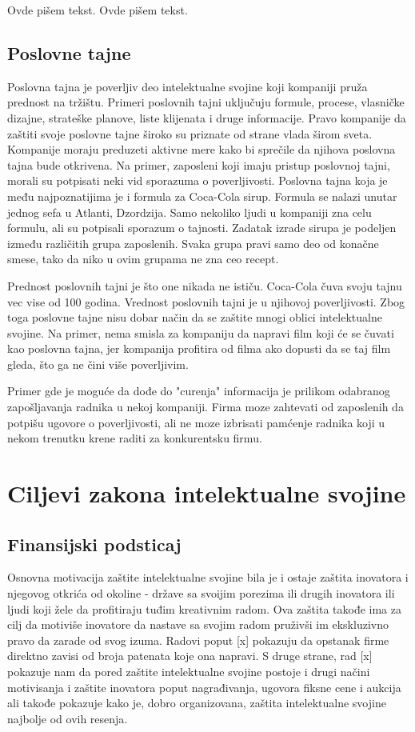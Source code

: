 \documentclass[a4paper]{article}
\begin{document}
Ovde pišem tekst. 
Ovde pišem tekst. 

\subsection{Poslovne tajne}
\label{subsec:poslovne}

Poslovna tajna je poverljiv deo intelektualne svojine koji kompaniji pruža prednost na tržištu. Primeri poslovnih tajni uključuju formule, procese, vlasničke dizajne, strateške planove, liste klijenata i druge informacije. Pravo kompanije da zaštiti svoje poslovne tajne široko su priznate od strane vlada širom sveta. Kompanije moraju preduzeti aktivne mere kako bi sprečile da njihova poslovna tajna bude otkrivena. Na primer, zaposleni koji imaju pristup poslovnoj tajni, morali su potpisati neki vid sporazuma o poverljivosti. Poslovna tajna koja je među najpoznatijima je i formula za Coca-Cola sirup. Formula se nalazi unutar jednog sefa u Atlanti, Dzordzija. Samo nekoliko ljudi u kompaniji zna celu formulu, ali su potpisali sporazum o tajnosti. Zadatak izrade sirupa je podeljen između različitih grupa zaposlenih. Svaka grupa pravi samo deo od konačne smese, tako da niko u ovim grupama ne zna ceo recept.

Prednost poslovnih tajni je što one nikada ne ističu. Coca-Cola čuva svoju tajnu vec vise od 100 godina.
Vrednost poslovnih tajni je u njihovoj poverljivosti. Zbog toga poslovne tajne nisu dobar način da se zaštite mnogi oblici intelektualne svojine. Na primer, nema smisla za kompaniju da napravi film koji će se čuvati kao poslovna tajna, jer kompanija profitira od filma ako dopusti da se taj film gleda, što ga ne čini više poverljivim.

Primer gde je moguće da dođe do "curenja" informacija je prilikom odabranog zapošljavanja radnika u nekoj kompaniji. Firma moze zahtevati od zaposlenih da potpišu ugovore o poverljivosti, ali ne moze izbrisati pamćenje radnika koji u nekom trenutku krene raditi za konkurentsku firmu.

\section{Ciljevi zakona intelektualne svojine}

\subsection{Finansijski podsticaj}

Osnovna motivacija zaštite intelektualne svojine bila je i ostaje zaštita inovatora i njegovog otkrića od okoline - države sa svoijim porezima ili drugih
inovatora ili ljudi koji žele da profitiraju tuđim kreativnim radom.
Ova zaštita takođe ima za cilj da motiviše inovatore da nastave sa svojim
radom pruživši im ekskluzivno pravo da zarade od svog izuma. Radovi poput [x] 
pokazuju da opstanak firme direktno zavisi od broja patenata koje ona napravi.
S druge strane, rad [x] pokazuje nam da pored zaštite intelektualne svojine 
postoje i drugi načini motivisanja i zaštite inovatora poput nagrađivanja, 
ugovora fiksne cene i aukcija ali takođe pokazuje kako je, dobro
organizovana, zaštita intelektualne svojine najbolje od ovih resenja.
\end{document}
